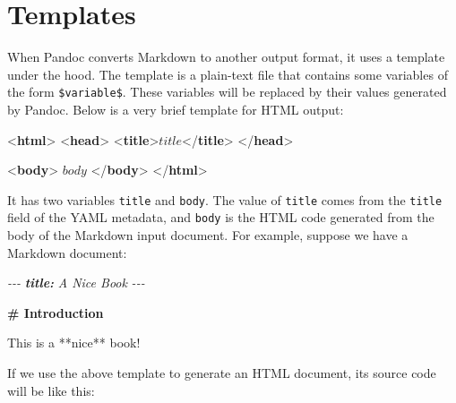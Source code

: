 \documentclass[
  12pt,
]{krantz}
\newenvironment{Shaded}{\begin{snugshade}}{\end{snugshade}}
\newcommand{\AnnotationTok}[1]{\textcolor[rgb]{0.56,0.35,0.01}{\textbf{\textit{#1}}}}
\newcommand{\CommentTok}[1]{\textcolor[rgb]{0.56,0.35,0.01}{\textit{#1}}}
\newcommand{\DataTypeTok}[1]{\textcolor[rgb]{0.13,0.29,0.53}{#1}}
\newcommand{\FunctionTok}[1]{\textcolor[rgb]{0.13,0.29,0.53}{\textbf{#1}}}
\newcommand{\KeywordTok}[1]{\textcolor[rgb]{0.13,0.29,0.53}{\textbf{#1}}}
\newcommand{\NormalTok}[1]{#1}
\theoremstyle{definition}
\theoremstyle{definition}
\theoremstyle{definition}
\theoremstyle{definition}
\theoremstyle{remark}
\begin{document}
\section{Templates}\label{templates}

When Pandoc converts Markdown to another output format, it uses a template under the hood. The template is a plain-text file that contains some variables of the form \texttt{\$variable\$}. These variables will be replaced by their values generated by Pandoc. Below is a very brief template for HTML output:

\begin{Shaded}
\begin{Highlighting}[]
\DataTypeTok{\textless{}}\KeywordTok{html}\DataTypeTok{\textgreater{}}
  \DataTypeTok{\textless{}}\KeywordTok{head}\DataTypeTok{\textgreater{}}
    \DataTypeTok{\textless{}}\KeywordTok{title}\DataTypeTok{\textgreater{}}\NormalTok{$title$}\DataTypeTok{\textless{}/}\KeywordTok{title}\DataTypeTok{\textgreater{}}
  \DataTypeTok{\textless{}/}\KeywordTok{head}\DataTypeTok{\textgreater{}}
  
  \DataTypeTok{\textless{}}\KeywordTok{body}\DataTypeTok{\textgreater{}}
\NormalTok{  $body$}
  \DataTypeTok{\textless{}/}\KeywordTok{body}\DataTypeTok{\textgreater{}}
\DataTypeTok{\textless{}/}\KeywordTok{html}\DataTypeTok{\textgreater{}}
\end{Highlighting}
\end{Shaded}

It has two variables \texttt{title} and \texttt{body}. The value of \texttt{title} comes from the \texttt{title} field of the YAML metadata, and \texttt{body} is the HTML code generated from the body of the Markdown input document. For example, suppose we have a Markdown document:

\begin{Shaded}
\begin{Highlighting}[]
\CommentTok{{-}{-}{-}}
\AnnotationTok{title:}\CommentTok{ A Nice Book}
\CommentTok{{-}{-}{-}}

\FunctionTok{\# Introduction}

\NormalTok{This is a **nice** book!}
\end{Highlighting}
\end{Shaded}

If we use the above template to generate an HTML document, its source code will be like this:
\end{document}
